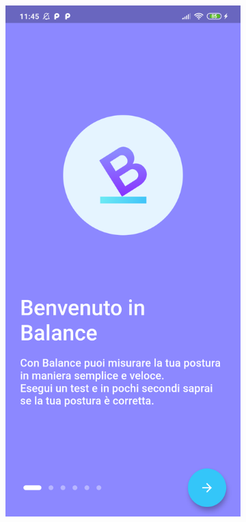 \begin{figure}[!htb]
    \centering
    \begin{subfigure}{0.35\textwidth}
        \includegraphics[width=\textwidth]{figures/screenshot/redmi_note_8t/welcome.png}

\end{subfigure}
\end{figure}
